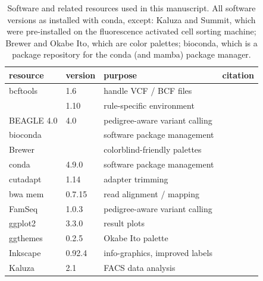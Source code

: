 \documentclass[authoryear,preprint,11pt]{scrartcl}
\begin{document}
\begin{center}
 \begin{table}[tbp]
  \caption{Software and related resources used in this manuscript. All software versions as installed with conda, except: Kaluza and Summit, which were pre-installed on the fluorescence activated cell sorting machine; Brewer and Okabe Ito, which are color palettes; bioconda, which is a package repository for the conda (and mamba) package manager.}
  \label{tab:software-overview}
  \small
  \begin{tabular}{llll}
    \toprule
    resource            & version   & purpose                       & citation \\
    \toprule
    bcftools            & 1.6       & handle VCF / BCF files        & \citep{danecek_variant_2011} \\
                        & 1.10      & rule-specific environment     &  \\
    \midrule
    BEAGLE 4.0          & 4.0       & pedigree-aware variant calling  & \citep{browning_improving_2013} \\
    \midrule
    bioconda            &           & software package management   &  \citep{gruning_bioconda:_2018}\\
    \midrule
    Brewer              &           & colorblind-friendly palettes  & \citep{brewer_colorbrewer_2006} \\
    \midrule
    conda               & 4.9.0     & software package management   &  \\
    \midrule
    cutadapt            & 1.14      & adapter trimming              & \citep{martin_cutadapt_2011} \\
    \midrule
    bwa mem             & 0.7.15    & read alignment / mapping      & \citep{li_aligning_2013} \\
    \midrule
    FamSeq              & 1.0.3     & pedigree-aware variant calling & \citep{peng_rare_2013,peng_famseq:_2014} \\
    \midrule
    ggplot2             & 3.3.0     & result plots                  & \citep{wickham_ggplot2_2016} \\
    \midrule
    ggthemes            & 0.2.5     & Okabe Ito palette             & \citep{arnold_ggthemes_2019} \\
    \midrule
    Inkscape            & 0.92.4    & info-graphics, improved labels & \\
    \midrule
    Kaluza              & 2.1       & FACS data analysis   &  \\

\end{tabular}
\end{table}
\end{center}
\end{document}
